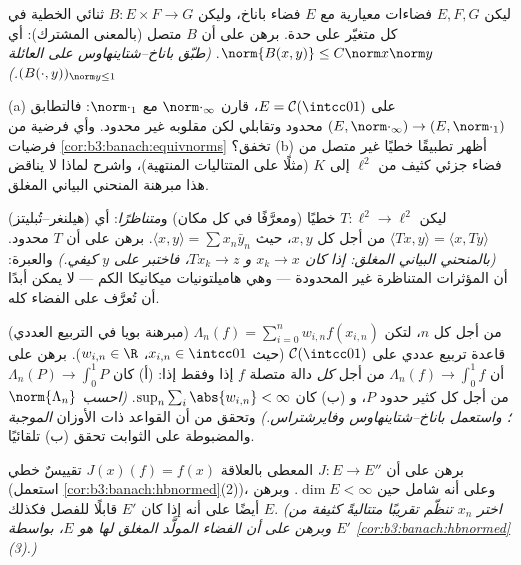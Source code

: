 \begin{exercise}[$\star\star$]\label{exo:b3:banach:6}
ليكن $E, F, G$ فضاءات معيارية مع $E$ فضاء باناخ، وليكن $B \colon E \times
F \to G$
ثنائي الخطية  في كل متغيّر على حدة. برهن على أن $B$ متصل
(بالمعنى المشترك): أي $\norm{B(x,y)} \leq
C\norm x\norm y$. \emph{(طبّق باناخ--شتاينهاوس
على العائلة $(B(\cdot, y))_{\norm y \leq 1}$.)}
\end{exercise}

\begin{exercise}[$\star\star$]\label{exo:b3:banach:7}
(a) على $E = \mathcal C(\intcc01)$، قارن $\norm\cdot_\infty$ مع $\norm\cdot_1$: فالتطابق
$(E, \norm\cdot_\infty) \to
(E, \norm\cdot_1)$ محدود وتقابلي لكن مقلوبه غير محدود. وأي فرضية من فرضيات
\cref{cor:b3:banach:equivnorms} تخفق؟
(b) أظهر تطبيقًا خطيًا غير متصل من فضاء جزئي كثيف من $\ell^2$
إلى $K$ (مثلًا على المتتاليات المنتهية)، واشرح لماذا لا يناقض
هذا مبرهنة المنحني البياني المغلق.
\end{exercise}

\begin{exercise}[$\star\star\star$]\label{exo:b3:banach:8}
(هيلنغر--تُبليتز) ليكن $T \colon \ell^2 \to \ell^2$ خطيًا (ومعرَّفًا في كل مكان)
و\emph{متناظرًا}: أي $\langle Tx,
y\rangle = \langle x, Ty\rangle$ من أجل كل $x, y$، حيث $\langle
x, y \rangle = \sum x_n\bar y_n$.
برهن على أن $T$ محدود. \emph{(بالمنحني البياني المغلق: إذا كان
$x_k \to x$ و $Tx_k \to z$، فاختبر على $y$ كيفي.)} والعبرة: أن
المؤثرات المتناظرة غير المحدودة --- وهي هاميلتونيات ميكانيكا
الكم --- لا يمكن أبدًا أن تُعرَّف على الفضاء كله.
\end{exercise}

\begin{exercise}[$\star\star\star$]\label{exo:b3:banach:9}
(مبرهنة بويا في التربيع العددي) من أجل كل $n$، لتكن $\Lambda_n(f)
= \sum_{i=0}^{n} w_{i,n}f(x_{i,n})$
قاعدة تربيع عددي على $\mathcal C(\intcc01)$ (حيث $x_{i,n} \in \intcc01$، $w_{i,n} \in
\R$). برهن على
أن $\Lambda_n(f) \to \int_0^1f$ من أجل \emph{كل} دالة متصلة $f$ إذا وفقط إذا: (أ)
كان $\Lambda_n(P) \to \int_0^1P$ من أجل كل كثير حدود $P$، و (ب) كان $\sup_n\sum_i\abs{w_{i,n}} <
\infty$.
\emph{(احسب $\norm{\Lambda_n}$؛ واستعمل باناخ--شتاينهاوس وفايرشتراس.)}
وتحقق من أن القواعد ذات الأوزان \emph{الموجبة} والمضبوطة على
الثوابت تحقق (ب) تلقائيًا.
\end{exercise}

\begin{exercise}[$\star\star$]\label{exo:b3:banach:10}
برهن على أن $J \colon E \to E''$ المعطى بالعلاقة $J(x)(f) = f(x)$ تقييسٌ خطي
(استعمل \cref{cor:b3:banach:hbnormed}(2))، وعلى أنه شامل حين $\dim E < \infty$. وبرهن أيضًا
على أنه إذا كان $E'$ قابلًا للفصل فكذلك $E$. \emph{(اختر $x_n$
تنظّم تقريبًا متتاليةً كثيفة من $E'$ وبرهن على أن الفضاء
المولَّد المغلق لها هو $E$، بواسطة \cref{cor:b3:banach:hbnormed}(3).)}
\end{exercise}

